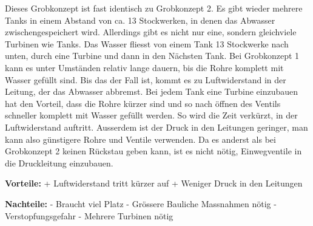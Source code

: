 Dieses Grobkonzept ist fast identisch zu Grobkonzept 2. Es gibt wieder mehrere Tanks in einem Abstand von ca. 13 Stockwerken, in denen das Abwasser zwischengespeichert wird. Allerdings gibt es nicht nur eine, sondern gleichviele Turbinen wie Tanks. Das Wasser fliesst von einem Tank 13 Stockwerke nach unten, durch eine Turbine und dann in den Nächsten Tank. Bei Grobkonzept 1 kann es unter Umständen relativ lange dauern, bis die Rohre komplett mit Wasser gefüllt sind. Bis das der Fall ist, kommt es zu Luftwiderstand in der Leitung, der das Abwasser abbremst. Bei jedem Tank eine Turbine einzubauen hat den Vorteil, dass die Rohre kürzer sind und so nach öffnen des Ventils schneller komplett mit Wasser gefüllt werden. So wird die Zeit verkürzt, in der Luftwiderstand auftritt. Ausserdem ist der Druck in den Leitungen geringer, man kann also günstigere Rohre und Ventile verwenden. Da es anderst als bei Grobkonzept 2 keinen Rückstau geben kann, ist es nicht nötig, Einwegventile in die Druckleitung einzubauen. 

\textbf{Vorteile:} 									\newline
+	Luftwiderstand tritt kürzer auf 				\newline
+	Weniger Druck in den Leitungen					\newline

\textbf{Nachteile:}									\newline
-	Braucht viel Platz								\newline
-	Grössere Bauliche Massnahmen nötig				\newline
-	Verstopfungsgefahr								\newline
-	Mehrere Turbinen nötig				
\newpage